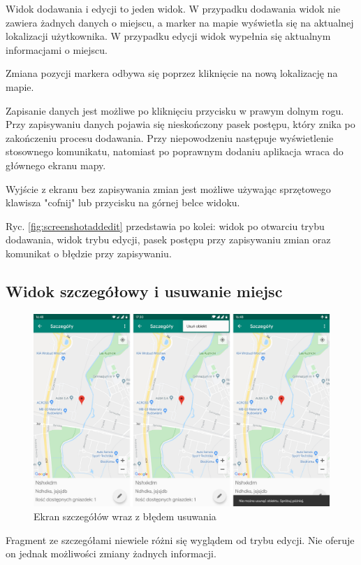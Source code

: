 \documentclass[polish,polish,a4paper,12pt]{article}
\begin{document}
	Widok dodawania i edycji to jeden widok. W przypadku dodawania widok nie zawiera żadnych danych o miejscu, a marker na mapie wyświetla się na aktualnej lokalizacji użytkownika. W przypadku edycji widok wypełnia się aktualnym informacjami o miejscu.

	Zmiana pozycji markera odbywa się poprzez kliknięcie na nową lokalizację na mapie.

	Zapisanie danych jest możliwe po kliknięciu przycisku w prawym dolnym rogu. Przy zapisywaniu danych pojawia się nieskończony pasek postępu, który znika po zakończeniu procesu dodawania. Przy niepowodzeniu następuje wyświetlenie stosownego komunikatu, natomiast po poprawnym dodaniu aplikacja wraca do głównego ekranu mapy.

	Wyjście z ekranu bez zapisywania zmian jest możliwe używając sprzętowego klawisza "cofnij" lub przycisku na górnej belce widoku.

	Ryc. \ref{fig:screenshotaddedit} przedstawia po kolei: widok po otwarciu trybu dodawania, widok trybu edycji, pasek postępu przy zapisywaniu zmian oraz komunikat o błędzie przy zapisywaniu.

	\subsection{Widok szczegółowy i usuwanie miejsc}

	\begin{figure}[H]
		\centering
		\includegraphics[width = \textwidth]{screenshot-detail}
		\caption{Ekran szczegółów wraz z błędem usuwania}
		\label{fig:screenshotdetail}
	\end{figure}

	Fragment ze szczegółami niewiele różni się wyglądem od trybu edycji. Nie oferuje on jednak możliwości zmiany żadnych informacji.
\end{document}
